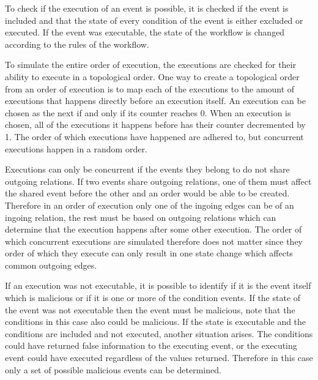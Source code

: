     \newpar To check if the execution of an event is possible, it is checked if the event is included and that the state of every condition of the event is either excluded or executed. If the event was executable, the state of the workflow is changed according to the rules of the workflow.
    
    \newpar To simulate the entire order of execution, the executions are checked for their ability to execute in a topological order. One way to create a topological order from an order of execution is to map each of the executions to the amount of executions that happens directly before an execution itself. An execution can be chosen as the next if and only if its counter reaches 0. When an execution is chosen, all of the executions it happens before has their counter decremented by 1. The order of which executions have happened are adhered to, but concurrent executions happen in a random order.
    
    Executions can only be concurrent if the events they belong to do not share outgoing relations. If two events share outgoing relations, one of them must affect the shared event before the other and an order would be able to be created. Therefore in an order of execution only one of the ingoing edges can be of an ingoing relation, the rest must be based on outgoing relations which can determine that the execution happens after some other execution. The order of which concurrent executions are simulated therefore does not matter since they order of which they execute can only result in one state change which affects common outgoing edges.
    
    \newpar If an execution was not executable, it is possible to identify if it is the event itself which is malicious or if it is one or more of the condition events. If the state of the event was not executable then the event must be malicious, note that the conditions in this case also could be malicious. If the state is executable and the conditions are included and not executed, another situation arises. The conditions could have returned false information to the executing event, or the executing event could have executed regardless of the values returned. Therefore in this case only a set of possible malicious events can be determined.

